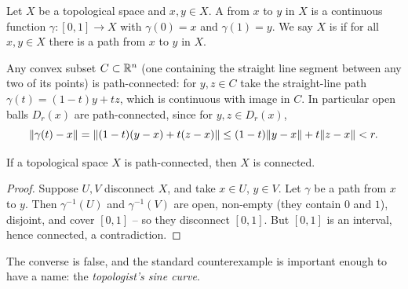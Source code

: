 \documentclass[a4paper]{scrartcl}
\begin{document}
\begin{definition}[Path]
    Let $X$ be a topological space and $x, y \in X$. A  from $x$ to $y$ in $X$ is a continuous function $\gamma: [0, 1] \rightarrow X$ with $\gamma(0) = x$ and $\gamma(1) = y$. We say $X$ is  if for all $x, y \in X$ there is a path from $x$ to $y$ in $X$.
\end{definition}

\begin{example}
    Any convex subset $C \subset \mathbb{R}^n$ (one containing the straight line segment between any two of its points) is path-connected: for $y, z \in C$ take the straight-line path $\gamma(t) = (1 - t)y + tz$, which is continuous with image in $C$. In particular open balls $D_r(x)$ are path-connected, since for $y, z \in D_r(x)$,
    $$
    \norm{\gamma(t) - x} = \norm{(1-t)(y - x) + t(z - x)} \leq (1 - t)\norm{y - x} + t\norm{z - x} < r.
    $$
\end{example}

\begin{theorem}
    If a topological space $X$ is path-connected, then $X$ is connected.
\end{theorem}
\begin{proof}
    Suppose $U, V$ disconnect $X$, and take $x \in U$, $y \in V$. Let $\gamma$ be a path from $x$ to $y$. Then $\gamma^{-1}(U)$ and $\gamma^{-1}(V)$ are open, non-empty (they contain $0$ and $1$), disjoint, and cover $[0, 1]$ -- so they disconnect $[0, 1]$. But $[0, 1]$ is an interval, hence connected, a contradiction.
\end{proof}

The converse is false, and the standard counterexample is important enough to have a name: the \emph{topologist's sine curve}.
\end{document}
